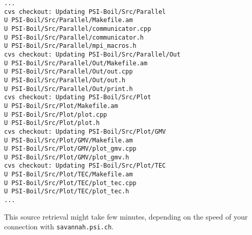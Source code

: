 {\small \begin{verbatim}
...
cvs checkout: Updating PSI-Boil/Src/Parallel
U PSI-Boil/Src/Parallel/Makefile.am
U PSI-Boil/Src/Parallel/communicator.cpp
U PSI-Boil/Src/Parallel/communicator.h
U PSI-Boil/Src/Parallel/mpi_macros.h
cvs checkout: Updating PSI-Boil/Src/Parallel/Out
U PSI-Boil/Src/Parallel/Out/Makefile.am
U PSI-Boil/Src/Parallel/Out/out.cpp
U PSI-Boil/Src/Parallel/Out/out.h
U PSI-Boil/Src/Parallel/Out/print.h
cvs checkout: Updating PSI-Boil/Src/Plot
U PSI-Boil/Src/Plot/Makefile.am
U PSI-Boil/Src/Plot/plot.cpp
U PSI-Boil/Src/Plot/plot.h
cvs checkout: Updating PSI-Boil/Src/Plot/GMV
U PSI-Boil/Src/Plot/GMV/Makefile.am
U PSI-Boil/Src/Plot/GMV/plot_gmv.cpp
U PSI-Boil/Src/Plot/GMV/plot_gmv.h
cvs checkout: Updating PSI-Boil/Src/Plot/TEC
U PSI-Boil/Src/Plot/TEC/Makefile.am
U PSI-Boil/Src/Plot/TEC/plot_tec.cpp
U PSI-Boil/Src/Plot/TEC/plot_tec.h
...
\end{verbatim}}

This source retrieval might take few minutes, depending on the speed of your
connection with {\tt savannah.psi.ch}. 


\vspace*{5mm}  %



